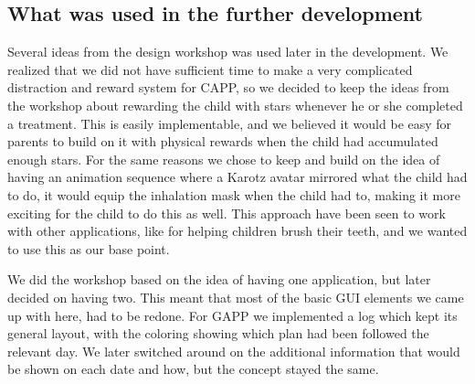 \subsection{What was used in the further development}
Several ideas from the design workshop was used later in the development. We realized that we did not have sufficient time to make a very complicated distraction and
reward system for CAPP, so we decided to keep the ideas from the workshop about rewarding the child with stars whenever he or she completed a treatment.
This is easily implementable, and we believed it would be easy for parents to build on it with physical rewards when the child had accumulated enough stars.
For the same reasons we chose to keep and build on the idea of having an animation sequence where a Karotz avatar mirrored what the child had to do, it would
equip the inhalation mask when the child had to, making it more exciting for the child to do this as well. This approach have been seen to work with other applications,
like for helping children brush their teeth, and we wanted to use this as our base point.

We did the workshop based on the idea of having
one application, but later decided on having two. This meant that most of the basic GUI elements we came up with here, had
to be redone. For GAPP we implemented a log which kept its general layout, with the coloring showing which plan had been followed the relevant day. We later switched around on the additional information
that would be shown on each date and how, but the concept stayed the same.